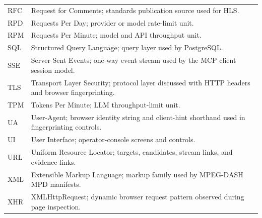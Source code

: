 \begin{longtable}{@{}Q{2.65cm}>{\raggedright\arraybackslash}p{12.75cm}@{}}
RFC & Request for Comments; standards publication source used for HLS. \\
RPD & Requests Per Day; provider or model rate-limit unit. \\
RPM & Requests Per Minute; model and API throughput unit. \\
SQL & Structured Query Language; query layer used by PostgreSQL. \\
SSE & Server-Sent Events; one-way event stream used by the MCP client session model. \\
TLS & Transport Layer Security; protocol layer discussed with HTTP headers and browser fingerprinting. \\
TPM & Tokens Per Minute; LLM throughput-limit unit. \\
UA & User-Agent; browser identity string and client-hint shorthand used in fingerprinting controls. \\
UI & User Interface; operator-console screens and controls. \\
URL & Uniform Resource Locator; targets, candidates, stream links, and evidence links. \\
XML & Extensible Markup Language; markup family used by MPEG-DASH MPD manifests. \\
XHR & XMLHttpRequest; dynamic browser request pattern observed during page inspection. \\
\bottomrule
\end{longtable}
\endgroup
\clearpage
